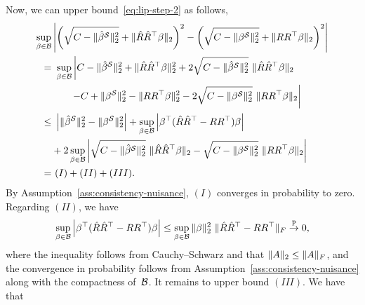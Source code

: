 Now, we can upper bound~\eqref{eq:lip-step-2} as follows,
\begin{align}
    \sup_{\beta \in \cB} &\left |\left(\sqrt{C - \norm{\hat{\beta}^{\cS}}_2^2}  + \norm{\PSperpM \beta}_2\right)^2 
    - \left(\sqrt{C - \norm{\betastarS}_2^2}  + \norm{\PSperpMpop \beta}_2\right)^2\right| \notag\\
    = &\ \sup_{\beta \in \cB} \left|
    C - \norm{\hat{\beta}^{\cS}}_2^2
    + \norm{\PSperpM \beta}_2^2 
    + 2 \sqrt{C - \norm{\hat{\beta}^{\cS}}_2^2}\ \norm{\PSperpM \beta}_2\right.\notag\\
    &\phantom{\sup_{\beta \in \cB}\ }\left.
    - C + \norm{\betastarS}_2^2 
    - \norm{\PSperpMpop \beta}_2^2
    - 2 \sqrt{C - \norm{\betastarS}_2^2}\  \norm{\PSperpMpop \beta}_2
    \right| \notag\\
    \leq &\ \left|\norm{\hat{\beta}^{\cS}}_2^2 - \norm{\betastarS}_2^2\right|
    + \sup_{\beta \in \cB} \left|\beta^\top (\PSperpM - \PSperpMpop) \beta\right|\notag\\ 
    &+2 \sup_{\beta \in \cB}\left|\sqrt{C - \norm{\hat{\beta}^{\cS}}_2^2}\ \norm{\PSperpM \beta}_2-\sqrt{C - \norm{\betastarS}_2^2}\ \norm{\PSperpMpop \beta}_2\right|\notag\\
    = &\ (I) + (II) + (III). \notag 
\end{align}
By Assumption~\ref{ass:consistency-nuisance}, $(I)$ converges in probability to zero. 
Regarding $(II)$, we have
\begin{align*}
    \sup_{\beta \in \mathcal{B}} \left|\beta^\top (\hat{R}\hat{R}^\top - RR^\top) \beta\right| 
    \leq 
     \sup_{\beta \in \mathcal{B}} 
     \|\beta\|_2^2\
     \|\hat{R}\hat{R}^\top - RR^\top\|_F
     \stackrel{\mathbb{P}}{\to}0,
\end{align*}
where the inequality follows from Cauchy--Schwarz and that $\|A\|_2 \leq \|A\|_F$, and the convergence in probability follows from Assumption~\ref{ass:consistency-nuisance} along with the compactness of~$\mathcal{B}$.
It remains to upper bound $(III)$. We have that
